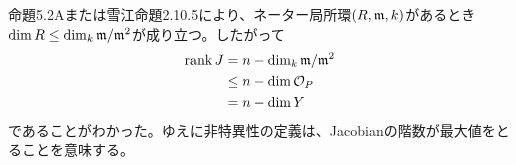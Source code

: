 \begin{rem}
  命題5.2Aまたは雪江\cite{雪江3}命題2.10.5により、ネーター局所環$(R,\mathfrak{m},k)$があるとき$\dim R \leq \dim_k \mathfrak{m} / \mathfrak{m}^2$が成り立つ。したがって
  \begin{align*}
    \operatorname{rank} J &= n - \dim_k \mathfrak{m} / \mathfrak{m}^2 \\
    &\leq n - \dim \mathcal{O}_P \\
    &= n - \dim Y
    \end{align*}
    であることがわかった。ゆえに非特異性の定義は、Jacobianの階数が最大値をとることを意味する。
\end{rem}





